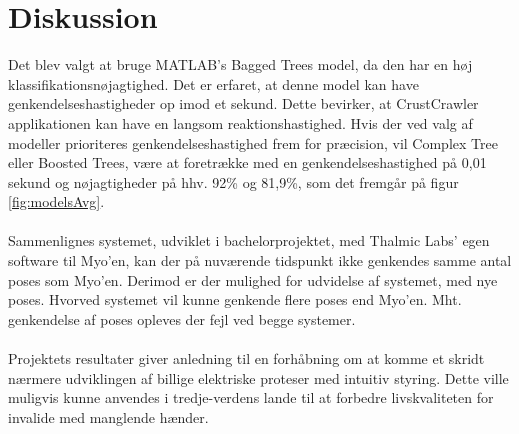 \section{Diskussion}
Det blev valgt at bruge MATLAB’s Bagged Trees model, da den har en høj klassifikationsnøjagtighed. Det er erfaret, at denne model kan have genkendelseshastigheder op imod et sekund. Dette bevirker, at CrustCrawler applikationen kan have en langsom reaktionshastighed. Hvis der ved valg af modeller prioriteres genkendelseshastighed frem for præcision, vil Complex Tree eller Boosted Trees, være at foretrække med en genkendelseshastighed på 0,01 sekund \citep{matFastModels} og nøjagtigheder på hhv. 92\% og 81,9\%, som det fremgår på figur \ref{fig:modelsAvg}.\\\\
Sammenlignes systemet, udviklet i bachelorprojektet, med Thalmic Labs’ egen software til Myo’en, kan der på nuværende tidspunkt ikke genkendes samme antal poses som Myo’en. Derimod er der mulighed for udvidelse af systemet, med nye poses. Hvorved systemet vil kunne genkende flere poses end Myo’en. Mht. genkendelse af poses opleves der fejl ved begge systemer.\\\\
Projektets resultater giver anledning til en forhåbning om at komme et skridt nærmere udviklingen af billige elektriske proteser med intuitiv styring. Dette ville muligvis kunne anvendes i tredje-verdens lande til at forbedre livskvaliteten for invalide med manglende hænder.